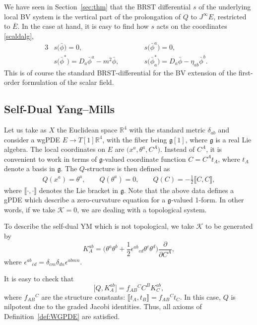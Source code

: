 \documentclass[pdftex]{sigma}
\numberwithin{equation}{section}
\theoremstyle{definition}
\newcommand{\Liealg}{\mathfrak}
\newcommand{\algg}{\Liealg{g}}
\def\cK{\mathcal{K}}
\newcommand{\lb}{\llbracket}
\newcommand{\rb}{\rrbracket}
\begin{document}
We have seen in Section~\ref{sec:thm} that the BRST differential $s$ of the underlying local BV system is the vertical part of the prolongation of $Q$ to $J^\infty E$, restricted to $\bar E$. In the case at hand, it is easy to find how $s$ acts on the coordinates \eqref{scaldalg},
\begin{alignat*}{3}
 &s\bigl(\bar\phi\bigr)=0,\qquad&& s\bigl(\bar\phi^a\bigr)=0,&\\
 &s\bigl(\bar\phi^*\bigr)=D_a\bar\phi^a-m^2\bar\phi,\qquad&& s\bigl(\bar\phi^*_a\bigr)=D_a\bar\phi-\eta_{ab}\bar\phi^b.&
 \end{alignat*}
This is of course the standard BRST-differential for the BV extension of the first-order formulation of the scalar field.

\subsection{Self-Dual Yang--Mills}%
Let us take as $X$ the Euclidean space $\mathbb{R}^4$ with the standard metric $\delta_{ab}$ and consider a wgPDE $E\rightarrow T[1]\mathbb{R}^4$, with the fiber being $\algg[1]$, where $\algg$ is a real Lie algebra. The local coordinates on $E$ are $\bigl(x^a,\theta^a,C^A\bigr)$. Instead of $C^A$, it is convenient to work in terms of $\algg$-valued coordinate function $C=C^At_A$, where $t_A$ denote a basis in $\algg$. The $Q$-structure is then defined as
\begin{gather*}%
 Q(x^a)=\theta^a,\qquad Q(\theta^a)=0,\qquad
 Q(C)=-\frac{1}{2}\lb C,C\rb,
\end{gather*}
where $\lb\cdot,\cdot\rb$ denotes the Lie bracket in $\algg$. Note that the above data defines a gPDE which describe a zero-curvature equation for a $\algg$-valued 1-form. In other words, if we take $\cK=0$, we are dealing with a topological system.

To describe the self-dual YM which is not topological, we take $\cK$ to be generated by
\begin{equation*}%
 K^{ab}_{A}=\biggl(\theta^a\theta^b+\frac12\epsilon^{ab}{}_{cd}\theta^c\theta^d\biggr)\frac{\partial}{\partial C^A},
\end{equation*}
where $\epsilon^{ab}{}_{cd}=\delta_{cm}\delta_{dn}\epsilon^{abmn}$.

It is easy to check that
\begin{equation*}
 \bigl[Q,K^{ab}_{A}\bigr]=f_{AB}{}^{C}C^B K^{ab}_{C},
\end{equation*}
where $f_{AB}{}^{C}$ are the structure constants: $\lb t_A,t_B \rb = f_{AB} {}^{C}t_C$.
In this case, $Q$ is nilpotent due to the graded Jacobi identities. Thus, all axioms of Definition~\ref{def:WGPDE} are satisfied.
\end{document}
